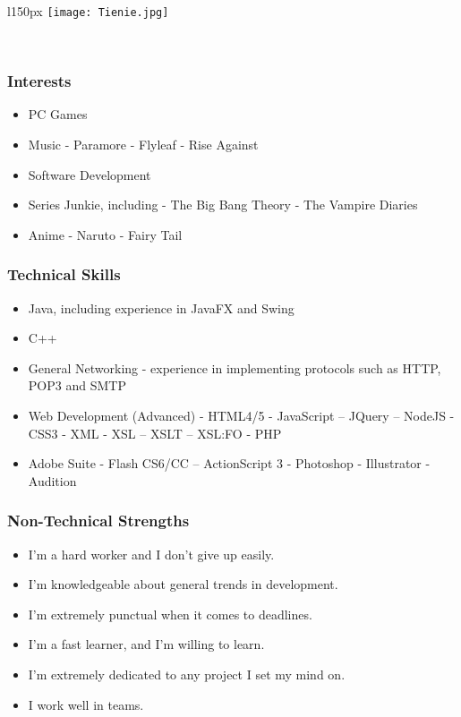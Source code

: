 \begin{wrapfigure}[7]{l}{150px}
\vspace{10pt}
\texttt{[image: Tienie.jpg]}
\end{wrapfigure}

\textcolor{white}{.}
\subsubsection{Interests}
\begin{itemize}
	\item{PC Games}
	\item{Music}
		\subitem- Paramore
		\subitem- Flyleaf
		\subitem- Rise Against
	\item{Software Development}
	\item{Series Junkie, including}
		\subitem- The Big Bang Theory
		\subitem- The Vampire Diaries
	\item{Anime}
		\subitem- Naruto
		\subitem- Fairy Tail
\end{itemize}
\subsubsection{Technical Skills}
\begin{itemize}
	\item{Java, including experience in JavaFX and Swing}
	\item{C++}
	\item{General Networking - experience in implementing protocols such as HTTP, POP3 and SMTP}
	\item{Web Development (Advanced)}
		\subitem- HTML4/5
		\subitem- JavaScript
			\subsubitem-- JQuery
			\subsubitem-- NodeJS
		\subitem- CSS3
		\subitem- XML
		\subitem- XSL
			\subsubitem-- XSLT
			\subsubitem-- XSL:FO
		\subitem- PHP
	\item Adobe Suite
		\subitem- Flash CS6/CC
			\subsubitem-- ActionScript 3
		\subitem- Photoshop
		\subitem- Illustrator
		\subitem- Audition
		
\end{itemize}

\subsubsection{Non-Technical Strengths}
\begin{itemize}
	\item{I'm a hard worker and I don't give up easily}.
	\item{I'm knowledgeable about general trends in development}.
	\item{I'm extremely punctual when it comes to deadlines}.
	\item{I'm a fast learner, and I'm willing to learn}.
	\item{I'm extremely dedicated to any project I set my mind on}.
	\item{I work well in teams}.
\end{itemize}